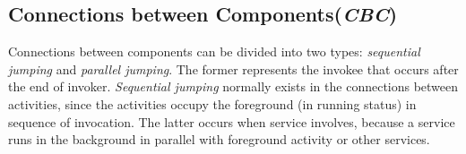



\subsection{Connections between Components(\textit{CBC})}
Connections between components can be divided into two types: \textit{sequential jumping} and \textit{parallel jumping}. The former represents the invokee that occurs after the end of invoker. \textit{Sequential jumping} normally exists in the connections between activities, since the activities occupy the foreground (in running status) in sequence of invocation. The latter occurs when service involves, because a service runs in the background in parallel with foreground activity or other services.

